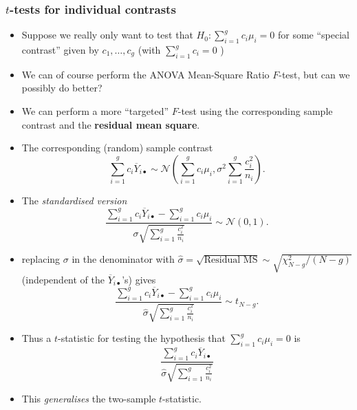 \documentclass[a4paper]{article}
\begin{document}
\subsubsection{\( t \)-tests for individual contrasts}
\begin{itemize}
	\item Suppose we really only want to test that \( H_0: \sum_{i=1}^{g} c_i \mu_i = 0 \) for some ``special contrast'' given by \( c_1,\dotsc,c_g \) (with \( \sum_{i=1}^{g} c_i = 0 \) )
	\item We can of course perform the ANOVA Mean-Square Ratio \( F \)-test, but can we possibly do better?
	\item We can perform a more ``targeted'' \( F \)-test using the corresponding sample contrast and the \textcolor{mygreen}{\textbf{residual mean square}}.
	\item The corresponding (random) sample contrast
	\[
		\sum_{i=1}^gc_i\overline Y_{i\bullet}\sim \mathcal{N} \left(\sum_{i=1}^gc_i\mu_{i}, \sigma^2\sum_{i=1}^g \frac{c_i^2}{n_i}\right).
	\]
	\item The \textit{standardised version}
	\[
		\frac{\sum_{i=1}^gc_i\overline Y_{i\bullet}-\sum_{i=1}^gc_i\mu_i}{\sigma\sqrt{\sum_{i=1}^g \frac{c_i^2}{n_i}}} \sim \mathcal{N}(0,1).
	\]
	\item replacing \( \sigma \) in the denominator with \( \hat{\sigma} = \sqrt{\text{Residual MS}} \sim \sqrt{\chi^{2}_{N-g}/(N-g)} \) (independent of the \( \overline{Y}_{i\bullet} \)'s) gives
	\[
		\frac{\sum_{i=1}^gc_i\overline Y_{i\bullet}-\sum_{i=1}^gc_i\mu_i}{\hat\sigma\sqrt{\sum_{i=1}^g \frac{c_i^2}{n_i}}} \sim t_{N-g}.
	\]
	\item Thus a \( t \)-statistic for testing the hypothesis that \( \sum_{i=1}^{g} c_i \mu_i = 0 \) is
	\[
		\frac{\sum_{i=1}^gc_i\overline Y_{i\bullet}}{\hat\sigma\sqrt{\sum_{i=1}^g \frac{c_i^2}{n_i}}}
	\]
	\item This \textit{generalises} the two-sample \( t \)-statistic.
\end{itemize}
\end{document}
